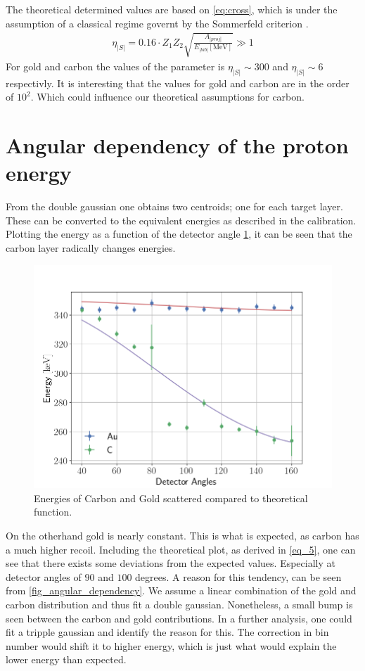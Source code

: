 The theoretical determined values are based on \cref{eq:cross}, which is under the assumption of a classical regime governt by the Sommerfeld criterion \parencite[p. 14]{noteBB}.
\begin{align}\label{eq:som}
\eta_|S|=0.16\cdot Z_1Z_2\sqrt{\frac{A_|proj|}{E_|lab|[\si{\mega\electronvolt}]}}\gg 1
\end{align}
For gold and carbon the values of the parameter is $\eta_|S|\sim 300$ and
$\eta_|S|\sim 6$ respectivly. It is interesting that the values for gold and carbon are in the order of $10^2$. Which could influence our theoretical assumptions for carbon. 

\section{Angular dependency of the proton energy}
From the double gaussian one obtains two centroids; one for each target layer.
These can be converted to the equivalent energies as described in the
calibration. Plotting the energy as a function of the detector angle
\cref{fig_energy}, it can be seen that the carbon layer radically changes
energies.
\begin{figure}[h!]
\centering
\includegraphics[width=0.99\columnwidth]{fig_energy}
\caption{Energies of Carbon and Gold scattered compared to theoretical
function.}
\label{fig_energy}
\end{figure}

On the otherhand gold is nearly constant. This is what is expected, as carbon
has a much higher recoil. Including the theoretical plot, as derived in
\cref{eq_5}, one can see that there exists some deviations from the expected
values. Especially at detector angles of $90$ and $100$ degrees.
A reason for this tendency, can be seen from \cref{fig_angular_dependency}. We
assume a linear combination of the gold and carbon distribution and thus fit a
double gaussian. Nonetheless, a small bump is seen between the carbon and gold
contributions. In a further analysis, one could fit a tripple gaussian and
identify the reason for this. The correction in bin number would shift it to
higher energy, which is just what would explain the lower energy than
expected.

